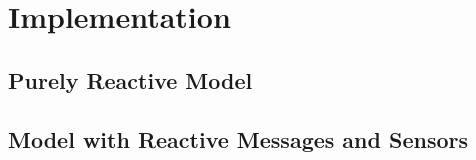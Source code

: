 
\chapter{Implementation}
\label{chap:implementation}

\section{Purely Reactive Model}









\section{Model with Reactive Messages and Sensors}


